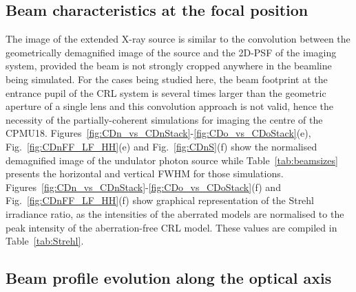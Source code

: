 \begin{refsection}
\begin{table}[t]
\begin{tabular}{rccc}
\end{tabular}
\end{table}{}

\subsection{Beam characteristics at the focal position}\label{sec:source_image_sim}

The image of the extended X-ray source is similar to the convolution between the geometrically demagnified image of the source and the 2D-PSF of the imaging system, provided the beam is not strongly cropped anywhere in the beamline being simulated. For the cases being studied here, the beam footprint at the entrance pupil of the CRL system is several times larger than the geometric aperture of a single lens and this convolution approach is not valid, hence the necessity of the partially-coherent simulations for imaging the centre of the CPMU18. Figures~\ref{fig:CDn_vs_CDnStack}-\ref{fig:CDo_vs_CDoStack}(e), Fig.~\ref{fig:CDnFF_LF_HH}(e) and Fig.~\ref{fig:CDnS}(f) show the normalised demagnified image of the undulator photon source while Table~\ref{tab:beamsizes} presents the horizontal and vertical FWHM for those simulations. Figures~\ref{fig:CDn_vs_CDnStack}-\ref{fig:CDo_vs_CDoStack}(f) and Fig.~\ref{fig:CDnFF_LF_HH}(f) show graphical representation of the Strehl irradiance ratio, as the intensities of the aberrated models are normalised to the peak intensity of the aberration-free CRL model. These values are compiled in Table~\ref{tab:Strehl}.

\subsection{Beam profile evolution along the optical axis}\label{sec:partcaustics_sim}


\end{refsection}
